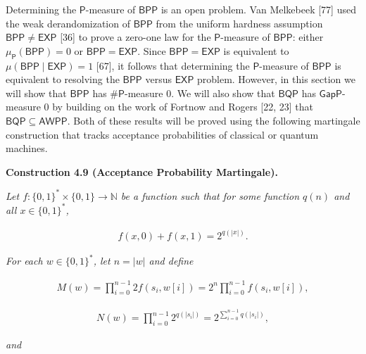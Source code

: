 \documentclass[10pt,a4paper]{article}
\begin{document}
Determining the $\mathsf{P}$-measure of $\mathsf{BPP}$ is an open problem. Van Melkebeek [77] used the weak derandomization of $\mathsf{BPP}$ from the uniform hardness assumption $\mathsf{BPP}\neq\mathsf{EXP}$ [36]
to prove a zero-one law for the $\mathsf{P}$-measure of $\mathsf{BPP}$:
either $\mu_{\mathsf{P}}(\mathsf{BPP})=0$ or $\mathsf{BPP}=\mathsf{EXP}$.
Since $\mathsf{BPP}=\mathsf{EXP}$ is equivalent to $\mu(\mathsf{BPP}\mid\mathsf{EXP})=1$ [67], it follows that determining the $\mathsf{P}$-measure of $\mathsf{BPP}$ is equivalent to resolving the $\mathsf{BPP}$ versus $\mathsf{EXP}$ problem. However, in this section we will show that $\mathsf{BPP}$ has ${\mathsf{\#}\mathsf{P}}$-measure 0. We will also show that $\mathsf{BQP}$ has $\mathsf{GapP}$-measure 0 by building on the work of Fortnow and Rogers [22, 23] that $\mathsf{BQP}\subseteq\mathsf{AWPP}$. Both of these results will be proved using the following martingale construction that tracks acceptance probabilities of classical or quantum machines.\par





\par\medskip\noindent\textbf{
\textbf{Construction 4.9}\textbf{ }(Acceptance Probability Martingale)\textbf{.}
}\par



\emph{Let $f:\{0,1\}^{*}\times\{0,1\}\to\mathbb{N}$ be a function such that for some function $q(n)$ and all $x\in\{0,1\}^{*}$,}\par


\[\begin{gathered}
f(x,0)+f(x,1)=2^{q(|x|)}.
\end{gathered}\]


\emph{For each $w\in\{0,1\}^{*}$, let $n=|w|$ and define}\par


\[\begin{gathered}
M(w)=\prod_{i=0}^{n-1}2f(s_{i},w[i])=2^{n}\prod_{i=0}^{n-1}f(s_{i},w[i]),
\end{gathered}\]


\[\begin{gathered}
N(w)=\prod_{i=0}^{n-1}2^{q(|s_{i}|)}=2^{\sum\limits_{i=0}^{n-1}q(|s_{i}|)},
\end{gathered}\]


\emph{and}\par
\end{document}
